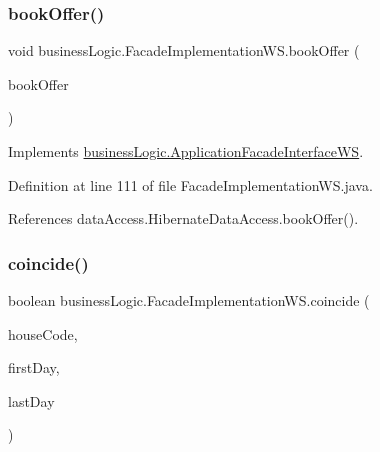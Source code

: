 \subsubsection{\texorpdfstring{bookOffer()}{bookOffer()}}
{\footnotesize\ttfamily void business\+Logic.\+Facade\+Implementation\+W\+S.\+book\+Offer (\begin{DoxyParamCaption}\item[{\mbox{\hyperlink{classdomain_1_1Offer}{Offer}}}]{book\+Offer }\end{DoxyParamCaption})}



Implements \mbox{\hyperlink{interfacebusinessLogic_1_1ApplicationFacadeInterfaceWS_a9f2916ad64674d13dbfbe58252e28531}{business\+Logic.\+Application\+Facade\+Interface\+WS}}.



Definition at line 111 of file Facade\+Implementation\+W\+S.\+java.


\begin{DoxyCode}{0}

\end{DoxyCode}


References data\+Access.\+Hibernate\+Data\+Access.\+book\+Offer().

\mbox{\label{classbusinessLogic_1_1FacadeImplementationWS_a6e8399739161cbb6a2830ebb9279de90}} 
\subsubsection{\texorpdfstring{coincide()}{coincide()}}
{\footnotesize\ttfamily boolean business\+Logic.\+Facade\+Implementation\+W\+S.\+coincide (\begin{DoxyParamCaption}\item[{\mbox{\hyperlink{classdomain_1_1RuralHouse}{Rural\+House}}}]{house\+Code,  }\item[{Date}]{first\+Day,  }\item[{Date}]{last\+Day }\end{DoxyParamCaption})}



